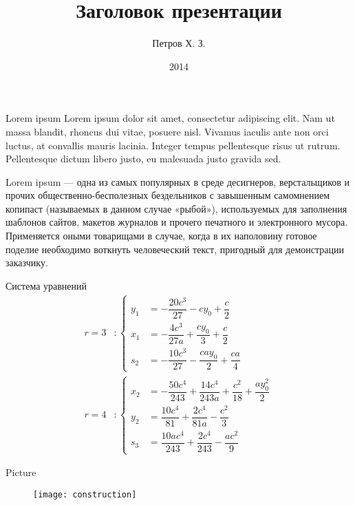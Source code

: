 \documentclass[hyperref={pdftex,unicode}]{beamer}
\title{Заголовок презентации}
\author{Петров Х. З.}
\date{2014}
\begin{document}
\begin{frame}
  \maketitle
\end{frame}

\begin{frame}{Lorem ipsum}
  Lorem ipsum dolor sit amet, consectetur adipiscing elit. Nam ut massa
  blandit, rhoncus dui vitae, posuere nisl. Vivamus iaculis ante non
  orci luctus, at convallis mauris lacinia. Integer tempus pellentesque
  risus ut rutrum. Pellentesque dictum libero justo, eu malesuada justo
  gravida sed.

  Lorem ipsum — одна из самых популярных в среде десигнеров,
  верстальщиков и прочих общественно-бесполезных бездельников с
  завышенным самомнением копипаст (называемых в данном случае «рыбой»),
  используемых для заполнения шаблонов сайтов, макетов журналов и
  прочего печатного и электронного мусора. Применяется оными товарищами
  в случае, когда в их наполовину готовое поделие необходимо воткнуть
  человеческий текст, пригодный для демонстрации заказчику.
\end{frame}

\begin{frame}{Система уравнений}
  $$
  \begin{aligned}
    r = 3 &:
    \left\{
      \begin{aligned}
        y_1 &= -\dfrac{20c^3}{27} - cy_0 + \dfrac{c}{2} \\
        x_1 &= -\dfrac{4c^3}{27a} + \dfrac{cy_0}{3} + \dfrac{c}{2} \\
        s_2 &= -\dfrac{10c^3}{27} - \dfrac{cay_0}{2} + \dfrac{ca}{4}
      \end{aligned}
    \right.
    \\
    r = 4 &:
    \left\{
      \begin{aligned}
        x_2 &= -\dfrac{50c^4}{243} + \dfrac{14c^4}{243a} + \dfrac{c^2}{18} + \dfrac{ay^2_0}{2}\\
        y_2 &= \dfrac{10c^4}{81} + \dfrac{2c^4}{81a} - \dfrac{c^2}{3} \\
        s_3 &= \dfrac{10ac^4}{243} + \dfrac{2c^4}{243} - \dfrac{ac^2}{9}
      \end{aligned}
    \right.
  \end{aligned}
  $$
\end{frame}

\begin{frame}{Picture}

\begin{figure}[H]
  \texttt{[image: construction]}
\end{figure}

\end{frame}
\end{document}
